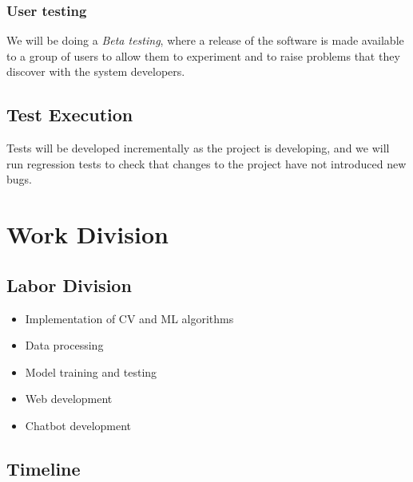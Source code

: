 \documentclass[11pt,bibliography=totocnumbered]{article}
\begin{document}
  \subsubsection{User testing}
  
  We will be doing a \emph{Beta testing}, where a release of the software is made available to a group of users to allow them to experiment and to raise problems that they discover with the system developers.
  
  \subsection{Test Execution}
  
  Tests will be developed incrementally as the project is developing, and we will run regression tests to check that changes to the project have not introduced new bugs. 
  
  \section{Work Division}
  
  \subsection{Labor Division}
  
  \begin{itemize}
  	\item Implementation of CV and ML algorithms
  	\item Data processing
  	\item Model training and testing
  	\item Web development
  	\item Chatbot development
  \end{itemize}
  
  \subsection{Timeline}
  
\end{document}

